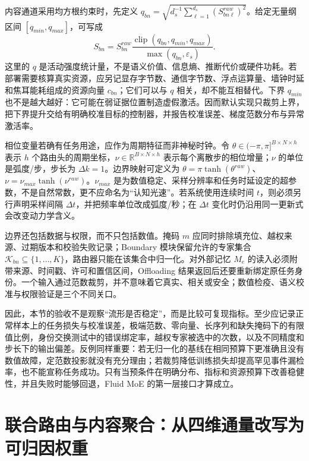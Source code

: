 内容通道采用均方根约束时，先定义 $q_{bn}=\sqrt{d_s^{-1}\sum_{\ell=1}^{d_s}(S^{raw}_{bn\ell})^2}$。给定无量纲区间 $[q_{min},q_{max}]$，可写成
\begin{equation}
S_{bn}=S^{raw}_{bn}\frac{\operatorname{clip}(q_{bn},q_{min},q_{max})}{\max(q_{bn},\varepsilon_s)}.
\end{equation}
这里的 $q$ 是活动强度统计量，不是语义价值、信息熵、推断代价或硬件功耗。若部署需要核算真实资源，应另记显存字节数、通信字节数、浮点运算量、墙钟时延和焦耳能耗组成的资源向量 $c_{bn}$；它们可以与 $q$ 相关，却不能互相替代。下界 $q_{min}$ 也不是越大越好：它可能在弱证据位置制造虚假激活。因而默认实现只裁剪上界，把下界提升交给有明确校准目标的控制器，并报告校准误差、梯度范数分布与异常激活率。

相位变量若确有任务用途，应作为周期特征而非神秘时钟。令 $\theta\in(-\pi,\pi]^{B\times N\times h}$ 表示 $h$ 个路由头的周期坐标，$\nu\in\mathbb{R}^{B\times N\times h}$ 表示每个离散步的相位增量；$\nu$ 的单位是弧度/步，步长为 $\Delta k=1$。边界映射可定义为 $\theta=\pi\tanh(\theta^{raw})$、$\nu=\nu_{max}\tanh(\nu^{raw})$。$\nu_{max}$ 是为数值稳定、采样分辨率和任务时延设定的超参数，不是自然常数，更不应命名为“认知光速”。若系统使用连续时间 $t$，则必须另行声明采样间隔 $\Delta t$，并把频率单位改成弧度/秒；在 $\Delta t$ 变化时仍沿用同一更新式会改变动力学含义。

边界还包括数据与权限，而不只包括数值。掩码 $m$ 应同时排除填充位、越权来源、过期版本和校验失败记录；Boundary 模块保留允许的专家集合 $\mathcal{K}_{bn}\subseteq\{1,\ldots,K\}$，路由器只能在该集合中归一化。对外部记忆 $M_e$ 的读入必须附带来源、时间戳、许可和置信区间，Offloading 结果返回后还要重新绑定原任务身份。一个输入通过范数裁剪，并不意味着它真实、相关或安全；数值检疫、语义校准与权限验证是三个不同关口。

因此，本节的验收不是观察“流形是否稳定”，而是比较可复现指标。至少应记录正常样本上的任务损失与校准误差，极端范数、零向量、长序列和缺失掩码下的有限值比例，身份交换测试中的错误绑定率，越权专家被选中的次数，以及不同精度和步长下的输出偏差。反例同样重要：若无归一化的基线在相同预算下更准确且没有数值故障，定范数投影就没有充分理由；若裁剪降低训练损失却提高罕见事件漏检率，也不能宣称任务成功。只有当预条件在明确分布、指标和资源预算下改善稳健性，并且失败时能够回退，Fluid MoE 的第一层接口才算成立。

\section{联合路由与内容聚合：从四维通量改写为可归因权重}
\label{sec:appendix_flux_attention}

